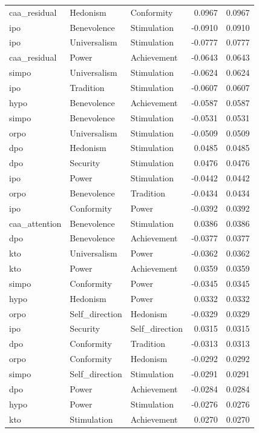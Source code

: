 \begin{tabular}{lllrr}
caa\_residual & Hedonism & Conformity & 0.0967 & 0.0967 \\
ipo & Benevolence & Stimulation & -0.0910 & 0.0910 \\
ipo & Universalism & Stimulation & -0.0777 & 0.0777 \\
caa\_residual & Power & Achievement & -0.0643 & 0.0643 \\
simpo & Universalism & Stimulation & -0.0624 & 0.0624 \\
ipo & Tradition & Stimulation & -0.0607 & 0.0607 \\
hypo & Benevolence & Achievement & -0.0587 & 0.0587 \\
simpo & Benevolence & Stimulation & -0.0531 & 0.0531 \\
orpo & Universalism & Stimulation & -0.0509 & 0.0509 \\
dpo & Hedonism & Stimulation & 0.0485 & 0.0485 \\
dpo & Security & Stimulation & 0.0476 & 0.0476 \\
ipo & Power & Stimulation & -0.0442 & 0.0442 \\
orpo & Benevolence & Tradition & -0.0434 & 0.0434 \\
ipo & Conformity & Power & -0.0392 & 0.0392 \\
caa\_attention & Benevolence & Stimulation & 0.0386 & 0.0386 \\
dpo & Benevolence & Achievement & -0.0377 & 0.0377 \\
kto & Universalism & Power & -0.0362 & 0.0362 \\
kto & Power & Achievement & 0.0359 & 0.0359 \\
simpo & Conformity & Power & -0.0345 & 0.0345 \\
hypo & Hedonism & Power & 0.0332 & 0.0332 \\
orpo & Self\_direction & Hedonism & -0.0329 & 0.0329 \\
ipo & Security & Self\_direction & 0.0315 & 0.0315 \\
dpo & Conformity & Tradition & -0.0313 & 0.0313 \\
orpo & Conformity & Hedonism & -0.0292 & 0.0292 \\
simpo & Self\_direction & Stimulation & -0.0291 & 0.0291 \\
dpo & Power & Achievement & -0.0284 & 0.0284 \\
hypo & Power & Stimulation & -0.0276 & 0.0276 \\
kto & Stimulation & Achievement & 0.0270 & 0.0270 \\

\end{tabular}
